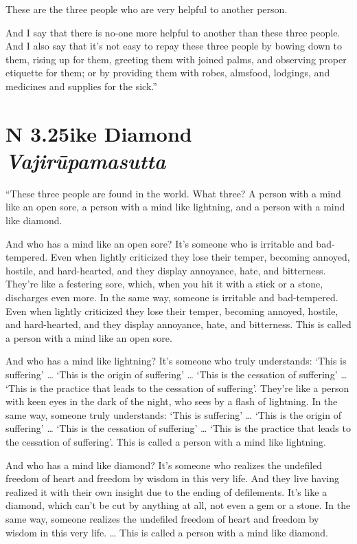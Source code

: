 \documentclass[12pt,openany]{book}%
\newcommand*{\suttatitleacronym}[1]{\smaller[2]{#1}\vspace*{.3em}}
\newcommand*{\suttatitletranslation}[1]{\linebreak{#1}}
\newcommand*{\suttatitleroot}[1]{\linebreak\smaller[2]\itshape{#1}}
\newcommand*{\tocacronym}[1]{\hspace*{-3.3em}{#1}\quad}
\newcommand*{\toctranslation}[1]{#1}
\newcommand*{\tocroot}[1]{(\textit{#1})}
\begin{document}
These are the three people who are very helpful to another person. 

And I say that there is no-one more helpful to another than these three people. And I also say that it’s not easy to repay these three people by bowing down to them, rising up for them, greeting them with joined palms, and observing proper etiquette for them; or by providing them with robes, almsfood, lodgings, and medicines and supplies for the sick.” 

%
\section*{{\suttatitleacronym AN 3.25}{\suttatitletranslation Like Diamond }{\suttatitleroot Vajirūpamasutta}}
\addcontentsline{toc}{section}{\tocacronym{AN 3.25} \toctranslation{Like Diamond } \tocroot{Vajirūpamasutta}}

“These three people are found in the world. What three? A person with a mind like an open sore, a person with a mind like lightning, and a person with a mind like diamond. 

And who has a mind like an open sore? It’s someone who is irritable and bad-tempered. Even when lightly criticized they lose their temper, becoming annoyed, hostile, and hard-hearted, and they display annoyance, hate, and bitterness. They’re like a festering sore, which, when you hit it with a stick or a stone, discharges even more. In the same way, someone is irritable and bad-tempered. Even when lightly criticized they lose their temper, becoming annoyed, hostile, and hard-hearted, and they display annoyance, hate, and bitterness. This is called a person with a mind like an open sore. 

And who has a mind like lightning? It’s someone who truly understands: ‘This is suffering’ … ‘This is the origin of suffering’ … ‘This is the cessation of suffering’ … ‘This is the practice that leads to the cessation of suffering’. They’re like a person with keen eyes in the dark of the night, who sees by a flash of lightning. In the same way, someone truly understands: ‘This is suffering’ … ‘This is the origin of suffering’ … ‘This is the cessation of suffering’ … ‘This is the practice that leads to the cessation of suffering’. This is called a person with a mind like lightning. 

And who has a mind like diamond? It’s someone who realizes the undefiled freedom of heart and freedom by wisdom in this very life. And they live having realized it with their own insight due to the ending of defilements. It’s like a diamond, which can’t be cut by anything at all, not even a gem or a stone. In the same way, someone realizes the undefiled freedom of heart and freedom by wisdom in this very life. … This is called a person with a mind like diamond. 
\end{document}
